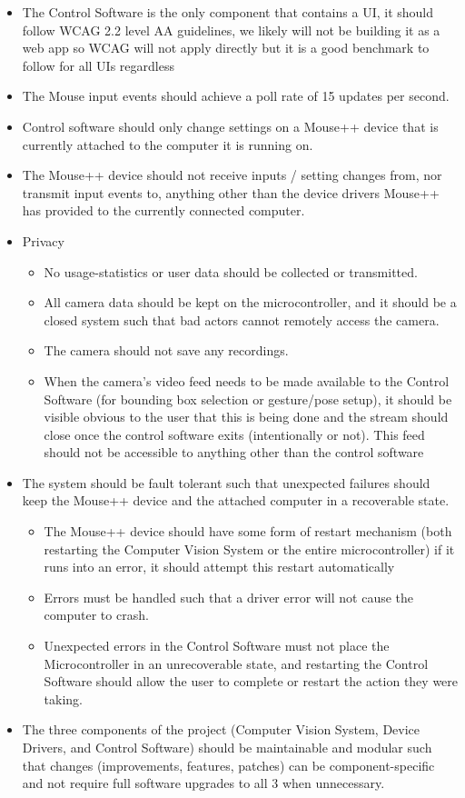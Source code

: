 \documentclass{article}
\begin{document}
\begin{itemize}
\item The Control Software is the only component that contains a UI, it should follow WCAG 2.2 level AA guidelines, we likely will not be building it as a web app so WCAG will not apply directly but it is a good benchmark to follow for all UIs regardless 
\item The Mouse input events should achieve a poll rate of 15 updates per second.
\item Control software should only change settings on a Mouse++ device that is currently attached to the computer it is running on.
\item The Mouse++ device should not receive inputs / setting changes from, nor transmit input events to, anything other than the device drivers Mouse++ has provided to the currently connected computer.
\item Privacy
  \begin{itemize}
    \item No usage-statistics or user data should be collected or transmitted.
    \item All camera data should be kept on the microcontroller, and it should be a closed system such that bad actors cannot remotely access the camera.
    \item The camera should not save any recordings.
    \item When the camera's video feed needs to be made available to the Control Software (for bounding box selection or gesture/pose setup), it should be visible obvious to the user that this is being done and the stream should close once the control software exits (intentionally or not). This feed should not be accessible to anything other than the control software
  \end{itemize}
\item The system should be fault tolerant such that unexpected failures should keep the Mouse++ device and the attached computer in a recoverable state.
    \begin{itemize}
    \item The Mouse++ device should have some form of restart mechanism (both restarting the Computer Vision System or the entire microcontroller) if it runs into an error, it should attempt this restart automatically
    \item Errors must be handled such that a driver error will not cause the computer to crash.
    \item Unexpected errors in the Control Software must not place the Microcontroller in an unrecoverable state, and restarting the Control Software should allow the user to complete or restart the action they were taking.
    \end{itemize}
\item The three components of the project (Computer Vision System, Device Drivers, and Control Software) should be maintainable and modular such that changes (improvements, features, patches) can be component-specific and not require full software upgrades to all 3 when unnecessary.
\end{itemize}
\end{document}
